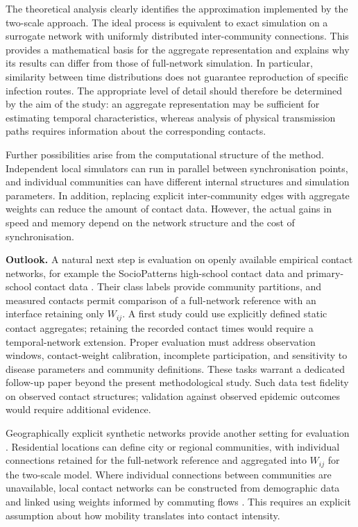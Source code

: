 \documentclass{ieeeaccess}
\begin{document}
The theoretical analysis clearly identifies the approximation implemented by the two-scale approach. The ideal process is equivalent to exact simulation on a surrogate network with uniformly distributed inter-community connections. This provides a mathematical basis for the aggregate representation and explains why its results can differ from those of full-network simulation. In particular, similarity between time distributions does not guarantee reproduction of specific infection routes. The appropriate level of detail should therefore be determined by the aim of the study: an aggregate representation may be sufficient for estimating temporal characteristics, whereas analysis of physical transmission paths requires information about the corresponding contacts.

Further possibilities arise from the computational structure of the method. Independent local simulators can run in parallel between synchronisation points, and individual communities can have different internal structures and simulation parameters. In addition, replacing explicit inter-community edges with aggregate weights can reduce the amount of contact data. However, the actual gains in speed and memory depend on the network structure and the cost of synchronisation.

\textbf{Outlook.} A natural next step is evaluation on openly available empirical contact networks, for example the SocioPatterns high-school contact data \cite{mastrandrea2015} and primary-school contact data \cite{stehle2011,gemmetto2014}. Their class labels provide community partitions, and measured contacts permit comparison of a full-network reference with an interface retaining only $W_{ij}$. A first study could use explicitly defined static contact aggregates; retaining the recorded contact times would require a temporal-network extension. Proper evaluation must address observation windows, contact-weight calibration, incomplete participation, and sensitivity to disease parameters and community definitions. These tasks warrant a dedicated follow-up paper beyond the present methodological study. Such data test fidelity on observed contact structures; validation against observed epidemic outcomes would require additional evidence.

Geographically explicit synthetic networks provide another setting for evaluation \cite{jiang2024synthetic}. Residential locations can define city or regional communities, with individual connections retained for the full-network reference and aggregated into $W_{ij}$ for the two-scale model. Where individual connections between communities are unavailable, local contact networks can be constructed from demographic data and linked using weights informed by commuting flows \cite{tulchinsky2024networks,tizzoni2014mobility}. This requires an explicit assumption about how mobility translates into contact intensity.
\end{document}
